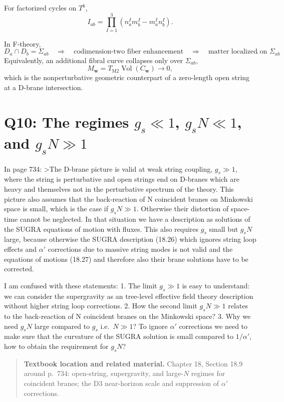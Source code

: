 \documentclass[
  10pt,
  a4paper,
  openany]{book}
\begin{document}
For factorized cycles on \(T^6\), \[
\boxed{
I_{ab}
=\prod_{I=1}^3
\left(n_a^Im_b^I-m_a^In_b^I\right)
}.
\]

In F-theory, \[
\boxed{
D_a\cap D_b=\Sigma_{ab}
\quad\Longrightarrow\quad
\text{codimension-two fiber enhancement}
\quad\Longrightarrow\quad
\text{matter localized on }\Sigma_{ab}
}.
\] Equivalently, an additional fibral curve collapses only over
\(\Sigma_{ab}\), \[
M_{\mathbf w}
=T_{\mathrm{M2}}\operatorname{Vol}(C_{\mathbf w})
\longrightarrow0,
\] which is the nonperturbative geometric counterpart of a zero-length
open string at a D-brane intersection.

\section{\texorpdfstring{Q10: The regimes \(g_s\ll1\), \(g_sN\ll1\), and
\(g_sN\gg1\)}{Q10: The regimes g\_s\textbackslash ll1, g\_sN\textbackslash ll1, and g\_sN\textbackslash gg1}}\label{q10-the-regimes-g_sll1-g_snll1-and-g_sngg1}

In page 734: \textgreater The D-brane picture is valid at weak string
coupling, \(g_{s}\gg 1\), where the string is perturbative and open
strings end on D-branes which are heavy and themselves not in the
perturbative spectrum of the theory. This picture also assumes that the
back-reaction of N coincident branes on Minkowski space is small, which
is the case if \(g_{s}N\gg 1\). Otherwise their distortion of space-time
cannot be neglected. In that situation we have a description as
solutions of the SUGRA equations of motion with fluxes. This also
requires \(g_{s}\) small but \(g_{s}N\) large, because otherwise the
SUGRA description (18.26) which ignores string loop effects and
\(\alpha'\) corrections due to massive string modes is not valid and the
equations of motions (18.27) and therefore also their brane solutions
have to be corrected.

I am confused with these statements: 1. The limit \(g_{s}\gg 1\) is easy
to understand: we can consider the supergravity as an tree-level
effective field theory description without higher string loop
corrections. 2. How the second limit \(g_{s}N\gg 1\) relates to the
back-reaction of N coincident branes on the Minkowski space? 3. Why we
need \(g_{s}N\) large compared to \(g_{s}\) i.e.~\(N\gg 1\)? To ignore
\(\alpha'\) corrections we need to make sure that the curvature of the
SUGRA solution is small compared to \(1 /\alpha'\), how to obtain the
requirement for \(g_{s}N\)?

\begin{quote}
\textbf{Textbook location and related material.} Chapter 18, Section
18.9 around p.~734: open-string, supergravity, and large-\(N\) regimes
for coincident branes; the D3 near-horizon scale and suppression of
\(\alpha'\) corrections.
\end{quote}
\end{document}
